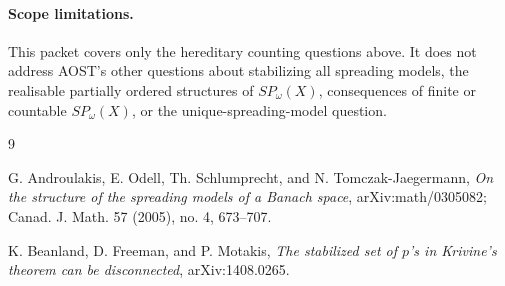 \documentclass[11pt]{article}
\begin{document}
\paragraph{Scope limitations.}
This packet covers only the hereditary counting questions above. It does not
address AOST's other questions about stabilizing all spreading models, the
realisable partially ordered structures of \(SP_\omega(X)\), consequences of
finite or countable \(SP_\omega(X)\), or the unique-spreading-model question.

\begin{thebibliography}{9}

G. Androulakis, E. Odell, Th. Schlumprecht, and N. Tomczak-Jaegermann,
\emph{On the structure of the spreading models of a Banach space},
arXiv:math/0305082; Canad. J. Math. 57 (2005), no. 4, 673--707.

K. Beanland, D. Freeman, and P. Motakis,
\emph{The stabilized set of \(p\)'s in Krivine's theorem can be disconnected},
arXiv:1408.0265.

\end{thebibliography}
\end{document}
